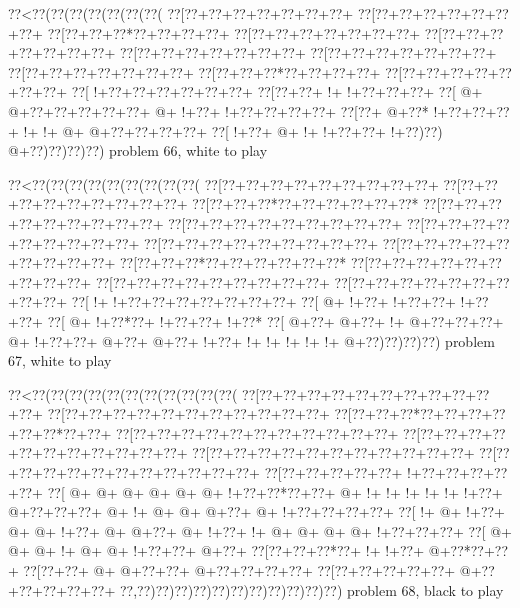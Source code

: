\vbox{\vbox{\goo
\0??<\0??(\0??(\0??(\0??(\0??(\0??(\0??(
\0??[\0??+\0??+\0??+\0??+\0??+\0??+\0??+
\0??[\0??+\0??+\0??+\0??+\0??+\0??+\0??+
\0??[\0??+\0??+\0??*\0??+\0??+\0??+\0??+
\0??[\0??+\0??+\0??+\0??+\0??+\0??+\0??+
\0??[\0??+\0??+\0??+\0??+\0??+\0??+\0??+
\0??[\0??+\0??+\0??+\0??+\0??+\0??+\0??+
\0??[\0??+\0??+\0??+\0??+\0??+\0??+\0??+
\0??[\0??+\0??+\0??+\0??+\0??+\0??+\0??+
\0??[\0??+\0??+\0??*\0??+\0??+\0??+\0??+
\0??[\0??+\0??+\0??+\0??+\0??+\0??+\0??+
\0??[\- !+\0??+\0??+\0??+\0??+\0??+\0??+
\0??[\0??+\0??+\- !+\- !+\0??+\0??+\0??+
\0??[\- @+\- @+\0??+\0??+\0??+\0??+\0??+
\- @+\- !+\0??+\- !+\0??+\0??+\0??+\0??+
\0??[\0??+\- @+\0??*\- !+\0??+\0??+\0??+
\- !+\- !+\- @+\- @+\0??+\0??+\0??+\0??+
\0??[\- !+\0??+\- @+\- !+\- !+\0??+\0??+
\- !+\0??)\0??)\- @+\0??)\0??)\0??)\0??)
}
\hfil problem 66, white to play\hfil\break
}

\vbox{\vbox{\goo
\0??<\0??(\0??(\0??(\0??(\0??(\0??(\0??(\0??(\0??(
\0??[\0??+\0??+\0??+\0??+\0??+\0??+\0??+\0??+\0??+
\0??[\0??+\0??+\0??+\0??+\0??+\0??+\0??+\0??+\0??+
\0??[\0??+\0??+\0??*\0??+\0??+\0??+\0??+\0??+\0??*
\0??[\0??+\0??+\0??+\0??+\0??+\0??+\0??+\0??+\0??+
\0??[\0??+\0??+\0??+\0??+\0??+\0??+\0??+\0??+\0??+
\0??[\0??+\0??+\0??+\0??+\0??+\0??+\0??+\0??+\0??+
\0??[\0??+\0??+\0??+\0??+\0??+\0??+\0??+\0??+\0??+
\0??[\0??+\0??+\0??+\0??+\0??+\0??+\0??+\0??+\0??+
\0??[\0??+\0??+\0??*\0??+\0??+\0??+\0??+\0??+\0??*
\0??[\0??+\0??+\0??+\0??+\0??+\0??+\0??+\0??+\0??+
\0??[\0??+\0??+\0??+\0??+\0??+\0??+\0??+\0??+\0??+
\0??[\0??+\0??+\0??+\0??+\0??+\0??+\0??+\0??+\0??+
\0??[\- !+\- !+\0??+\0??+\0??+\0??+\0??+\0??+\0??+
\0??[\- @+\- !+\0??+\- !+\0??+\0??+\- !+\0??+\0??+
\0??[\- @+\- !+\0??*\0??+\- !+\0??+\0??+\- !+\0??*
\0??[\- @+\0??+\- @+\0??+\- !+\- @+\0??+\0??+\0??+
\- @+\- !+\0??+\0??+\- @+\0??+\- @+\0??+\- !+\0??+
\- !+\- !+\- !+\- !+\- !+\- @+\0??)\0??)\0??)\0??)
}
\hfil problem 67, white to play\hfil\break
}

\vbox{\vbox{\goo
\0??<\0??(\0??(\0??(\0??(\0??(\0??(\0??(\0??(\0??(\0??(\0??(
\0??[\0??+\0??+\0??+\0??+\0??+\0??+\0??+\0??+\0??+\0??+\0??+
\0??[\0??+\0??+\0??+\0??+\0??+\0??+\0??+\0??+\0??+\0??+\0??+
\0??[\0??+\0??+\0??*\0??+\0??+\0??+\0??+\0??+\0??*\0??+\0??+
\0??[\0??+\0??+\0??+\0??+\0??+\0??+\0??+\0??+\0??+\0??+\0??+
\0??[\0??+\0??+\0??+\0??+\0??+\0??+\0??+\0??+\0??+\0??+\0??+
\0??[\0??+\0??+\0??+\0??+\0??+\0??+\0??+\0??+\0??+\0??+\0??+
\0??[\0??+\0??+\0??+\0??+\0??+\0??+\0??+\0??+\0??+\0??+\0??+
\0??[\0??+\0??+\0??+\0??+\0??+\- !+\0??+\0??+\0??+\0??+\0??+
\0??[\- @+\- @+\- @+\- @+\- @+\- @+\- !+\0??+\0??*\0??+\0??+
\- @+\- !+\- !+\- !+\- !+\- !+\- !+\0??+\- @+\0??+\0??+\0??+
\- @+\- !+\- @+\- @+\- @+\0??+\- @+\- !+\0??+\0??+\0??+\0??+
\0??[\- !+\- @+\- !+\0??+\- @+\- @+\- !+\0??+\- @+\- @+\0??+
\- @+\- !+\0??+\- !+\- @+\- @+\- @+\- @+\- !+\0??+\0??+\0??+
\0??[\- @+\- @+\- @+\- !+\- @+\- @+\- !+\0??+\0??+\- @+\0??+
\0??[\0??+\0??+\0??*\0??+\- !+\- !+\0??+\- @+\0??*\0??+\0??+
\0??[\0??+\0??+\- @+\- @+\0??+\0??+\- @+\0??+\0??+\0??+\0??+
\0??[\0??+\0??+\0??+\0??+\0??+\- @+\0??+\0??+\0??+\0??+\0??+
\0??,\0??)\0??)\0??)\0??)\0??)\0??)\0??)\0??)\0??)\0??)\0??)
}
\hfil problem 68, black to play\hfil\break
}

